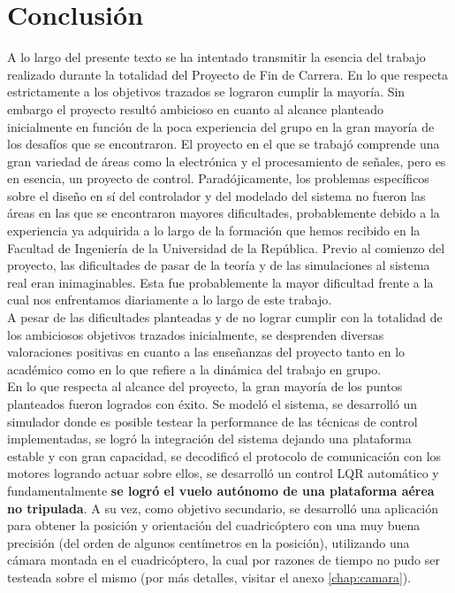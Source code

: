 \documentclass[main]{subfiles}
\begin{document}
\chapter*{Conclusi\'on}

A lo largo del presente texto se ha intentado transmitir la esencia  del trabajo realizado durante la totalidad del Proyecto de Fin de Carrera. En lo que respecta estrictamente a los objetivos trazados se lograron cumplir la mayoría. Sin embargo el proyecto result\'o ambicioso en cuanto al alcance planteado inicialmente en funci\'on de la poca experiencia del grupo en la gran mayor\'ia de los desaf\'ios que se encontraron. El proyecto en el que se trabaj\'o comprende una gran variedad de \'areas como la electr\'onica y el procesamiento de señales, pero es en esencia, un proyecto de control. Parad\'ojicamente, los problemas espec\'ificos sobre el diseño en s\'i del controlador y del modelado del sistema no fueron las \'areas en las que se encontraron mayores dificultades, probablemente debido a la experiencia ya adquirida a lo largo de la formaci\'on que hemos recibido en la Facultad de Ingeniería de la Universidad de la República. Previo al comienzo del proyecto, las dificultades de pasar de la teor\'ia y de las simulaciones al sistema real eran inimaginables. Esta fue probablemente la mayor dificultad frente a la cual nos enfrentamos diariamente a lo largo de este trabajo.\\

A pesar de las dificultades planteadas y de no lograr cumplir con la totalidad de los ambiciosos objetivos trazados inicialmente, se desprenden diversas valoraciones positivas en cuanto a las enseñanzas del proyecto tanto en lo acad\'emico como en lo que refiere a la din\'amica del trabajo en grupo.\\

En lo que respecta al alcance del proyecto, la gran mayoría de los puntos planteados fueron logrados con \'exito. Se modeló el sistema, se desarrolló un simulador donde es posible testear la performance de las técnicas de control implementadas, se logró la integración del sistema dejando una plataforma estable y con gran capacidad, se decodificó el protocolo de comunicación con los motores logrando actuar sobre ellos, se desarrolló un control LQR automático y fundamentalmente \textbf{se logró el vuelo autónomo de una plataforma aérea no tripulada}. A su vez, como objetivo secundario, se desarrolló una aplicación para obtener la posición y orientación del cuadricóptero con una muy buena precisión (del orden de algunos centímetros en la posición), utilizando una cámara montada en el cuadricóptero, la cual por razones de tiempo no pudo ser testeada sobre el mismo (por más detalles, visitar el anexo \ref{chap:camara}).\\
\end{document}
